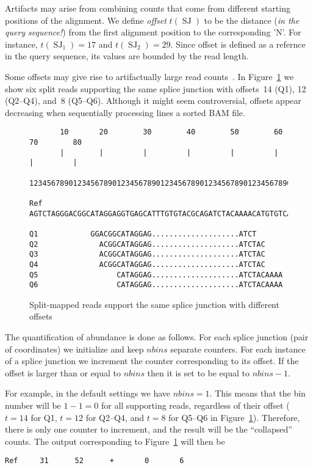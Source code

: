 \documentclass{article}
\DeclareMathOperator{\SJ}{SJ}
\begin{document}
Artifacts may arise from combining counts that come from different starting positions of the alignment. We 
define {\em offset} $t(\SJ)$ to be the distance ({\em in the query sequence!}) from the first 
alignment position to the corresponding 'N'. For instance, $t(\SJ_1)=17$ and $t(\SJ_2) = 29$. Since offset
is defined as a refernce in the query sequence, its values are bounded by the read length.

Some offsets may give rise to artifactually large read counts~\cite{pmid22537040}. In Figure~\ref{fig::02} 
we show six split reads supporting the same splice junction with offsets~14 (Q1), 12 (Q2--Q4), and~8 (Q5--Q6).
Although it might seem controversial, offsets appear decreasing when sequentially processing lines a sorted 
BAM file.
%
\begin{figure}[h]
\footnotesize
\begin{verbatim}
       10       20        30        40        50        60        70        80
       |        |         |         |         |         |         |         |
       123456789012345678901234567890123456789012345678901234567890123456789012

Ref    AGTCTAGGGACGGCATAGGAGGTGAGCATTTGTGTACGCAGATCTACAAAACATGTGTCACGGATAGGATCG

Q1            GGACGGCATAGGAG....................ATCT      
Q2              ACGGCATAGGAG....................ATCTAC    
Q3              ACGGCATAGGAG....................ATCTAC    
Q4              ACGGCATAGGAG....................ATCTAC    
Q5                  CATAGGAG....................ATCTACAAAA
Q6                  CATAGGAG....................ATCTACAAAA
\end{verbatim}
\caption{Split-mapped reads support the same splice junction with different offsets\label{fig::02}}
\end{figure}

The quantification of abundance is done as follows. For each splice junction (pair of coordinates) 
we initialize and keep $nbins$ separate counters. For each instance of a splice junction we increment 
the counter corresponding to its offset. If the offset is larger than or equal to $nbins$ then it is 
set to be equal to $nbins-1$.

For example, in the default settings we have $nbins=1$. This means that the bin number will be $1-1=0$ 
for all supporting reads, regardless of their offset ($t=14$ for Q1, $t=12$ for Q2--Q4, and $t=8$ for 
Q5--Q6 in Figure~\ref{fig::02}). Therefore, there is only one counter to increment, and the result will 
be the ``collapsed'' counts. The output corresponding to Figure~\ref{fig::02} will then be
\begin{verbatim}
Ref     31      52      +       0       6
\end{verbatim}
\end{document}
